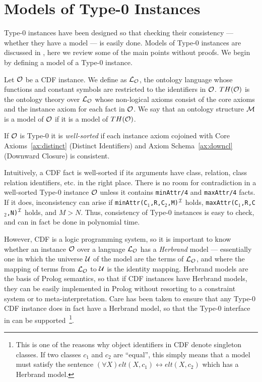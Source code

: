 \section{Models of Type-0 Instances} \label{sec:type0models}

Type-0 instances have been designed so that checking their consistency
--- whether they have a model --- is easily done.  Models of Type-0
instances are discussed in \cite{SwiW03b}, here we review some of the
main points without proofs.  We begin by defining a model of a Type-0
instance.

\begin{definition} \label{def:ont-th}
Let ${\cal O}$ be a CDF instance.  We define as ${\cal L}_{{\cal O}}$, the ontology
language whose functions and constant symbols are restricted to the
identifiers in ${\cal O}$.  $TH({\cal O})$ is the ontology theory over
${\cal L}_{{\cal O}}$ whose non-logical axioms consist of the core axioms and
the instance axiom for each fact in ${\cal O}$.
We say that an ontology structure ${\cal M}$ is a model of ${\cal O}$ if it is a
model of $TH({\cal O})$.

If ${\cal O}$ is Type-0 it is {\em well-sorted} if each instance axiom
cojoined with Core Axioms~\ref{ax:distinct} (Distinct Identifiers) and
Axiom Schema~\ref{ax:downcl} (Downward Closure) is consistent.
\end{definition}

Intuitively, a CDF fact is well-sorted if its arguments have class,
relation, class relation identifiers, etc. in the right place.  There
is no room for contradiction in a well-sorted Type-0 instance ${\cal O}$
unless it contains {\tt minAttr/4} and {\tt maxAttr/4} facts.  If it
does, inconsistency can arise if {\tt minAttr(C$_1$,R,C$_2$,M)}$^{{\cal I}}$
holds, {\tt maxAttr(C$_1$,R,C$_2$,N)}$^{{\cal I}}$ holds, and $M > N$.
Thus, consistency of Type-0 instances is easy to check, and can in
fact be done in polynomial time.

However, CDF is a logic programming system, so it is important to know
whether an instance ${\cal O}$ over a language ${\cal L}_{{\cal O}}$ has a {\em
Herbrand} model \cite{Lloy84} --- essentially one in which the
universe ${\cal U}$ of the model are the terms of ${\cal L}_{{\cal O}}$, and where
the mapping of terms from ${\cal L}_{{\cal O}}$ to ${\cal U}$ is the identity
mapping.  Herbrand models are the basis of Prolog semantics, so that
if CDF instances have Herbrand models, they can be easily implemented
in Prolog without resorting to a constraint system or to
meta-interpretation.  Care has been taken to ensure that any Type-0
CDF instance does in fact have a Herbrand model, so that the Type-0
interface in  can be supported~\footnote{This is one
of the reasons why object identifiers in CDF denote singleton classes.
If two classes $c_1$ and $c_2$ are ``equal'', this simply means that a
model must satisfy the sentence $(\forall X) elt(X,c_1)
\leftrightarrow elt(X,c_2)$ which has a Herbrand model.}.
